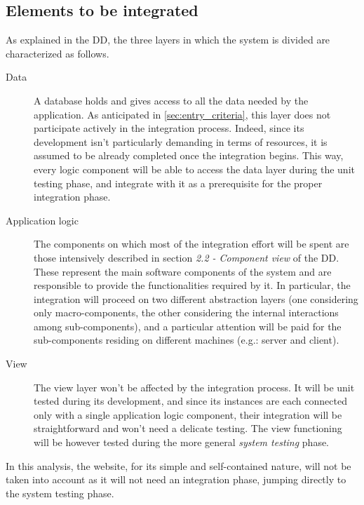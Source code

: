 \subsection{Elements to be integrated}
\label{sec:elements_to_be_integrated}
	As explained in the DD, the three layers in which the system is divided are characterized as follows.
	\begin{description}
		\item[Data] A database holds and gives access to all the data needed by the application. As anticipated in \autoref{sec:entry_criteria}, this layer does not participate actively in the integration process. Indeed, since its development isn't particularly demanding in terms of resources, it is assumed to be already completed once the integration begins. This way, every logic component will be able to access the data layer during the unit testing phase, and integrate with it as a prerequisite for the proper integration phase.
		\item[Application logic] The components on which most of the integration effort will be spent are those intensively described in section \textit{2.2 - Component view} of the DD. These represent the main software components of the system and are responsible to provide the functionalities required by it. In particular, the integration will proceed on two different abstraction layers (one considering only macro-components, the other considering the internal interactions among sub-components), and a particular attention will be paid for the sub-components residing on different machines (e.g.: server and client).
		\item[View] The view layer won't be affected by the integration process. It will be unit tested during its development, and since its instances are each connected only with a single application logic component, their integration will be straightforward and won't need a delicate testing. The view functioning will be however tested during the more general \textit{system testing} phase. %
	\end{description}
	In this analysis, the website, for its simple and self-contained nature, will not be taken into account as it will not need an integration phase, jumping directly to the system testing phase.	\newline

